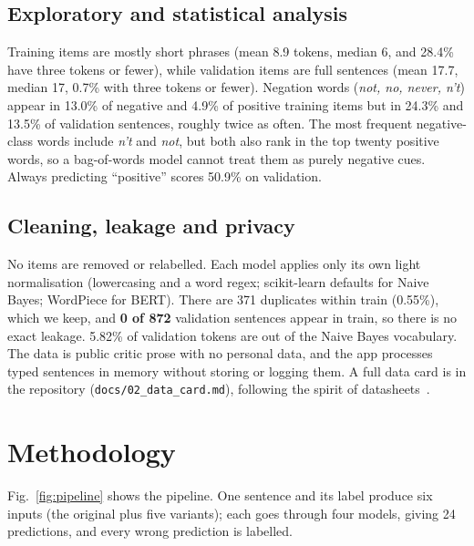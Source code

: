 \documentclass[conference]{IEEEtran}
\begin{document}
\subsection{Exploratory and statistical analysis}
Training items are mostly short phrases (mean 8.9 tokens, median 6, and 28.4\% have three tokens
or fewer), while validation items are full sentences (mean 17.7, median 17, 0.7\% with three
tokens or fewer). Negation words (\emph{not, no, never, n't}) appear in 13.0\% of negative and
4.9\% of positive training items but in 24.3\% and 13.5\% of validation sentences, roughly twice
as often. The most frequent negative-class words include \emph{n't} and \emph{not}, but both also
rank in the top twenty positive words, so a bag-of-words model cannot treat them as purely
negative cues. Always predicting ``positive'' scores 50.9\% on validation.

\subsection{Cleaning, leakage and privacy}
No items are removed or relabelled. Each model applies only its own light normalisation
(lowercasing and a word regex; scikit-learn defaults for Naive Bayes; WordPiece for BERT). There
are 371 duplicates within train (0.55\%), which we keep, and \textbf{0 of 872} validation sentences
appear in train, so there is no exact leakage. 5.82\% of validation tokens are out of the Naive
Bayes vocabulary. The data is public critic prose with no personal data, and the app processes
typed sentences in memory without storing or logging them. A full data card is in the repository
(\texttt{docs/02\_data\_card.md}), following the spirit of datasheets~\cite{gebru2021}.

\section{Methodology}\label{sec:method}

Fig.~\ref{fig:pipeline} shows the pipeline. One sentence and its label produce six inputs (the
original plus five variants); each goes through four models, giving 24 predictions, and every wrong
prediction is labelled.
\end{document}
